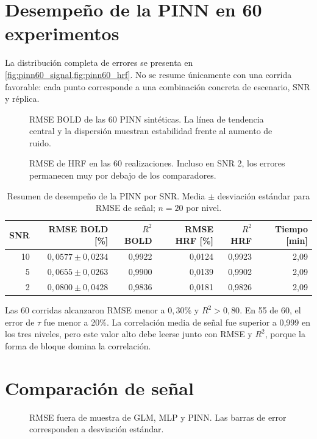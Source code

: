 \section{Desempeño de la PINN en 60 experimentos}
La distribución completa de errores se presenta en \cref{fig:pinn60_signal,fig:pinn60_hrf}. No se resume únicamente con una corrida favorable: cada punto corresponde a una combinación concreta de escenario, SNR y réplica.

\begin{figure}[H]
\centering
{}
\caption{RMSE BOLD de las 60 PINN sintéticas. La línea de tendencia central y la dispersión muestran estabilidad frente al aumento de ruido.}
\label{fig:pinn60_signal}
\end{figure}

\begin{figure}[H]
\centering
{}
\caption{RMSE de HRF en las 60 realizaciones. Incluso en SNR 2, los errores permanecen muy por debajo de los comparadores.}
\label{fig:pinn60_hrf}
\end{figure}

\begin{table}[H]
\centering
\caption{Resumen de desempeño de la PINN por SNR. Media $\pm$ desviación estándar para RMSE de señal; $n=20$ por nivel.}
\label{tab:pinn_summary}
\begin{tabular}{rrrrrr}
\toprule
\textbf{SNR} & \textbf{RMSE BOLD [\%]} & \textbf{$R^2$ BOLD} & \textbf{RMSE HRF [\%]} & \textbf{$R^2$ HRF} & \textbf{Tiempo [min]} \\
\midrule
10 & $0,0577\pm0,0234$ & 0,9922 & 0,0124 & 0,9923 & 2,09 \\
5  & $0,0655\pm0,0263$ & 0,9900 & 0,0139 & 0,9902 & 2,09 \\
2  & $0,0800\pm0,0428$ & 0,9836 & 0,0181 & 0,9826 & 2,09 \\
\bottomrule
\end{tabular}
\end{table}

Las 60 corridas alcanzaron RMSE menor a $0{,}30\%$ y $R^2>0{,}80$. En 55 de 60, el error de $\tau$ fue menor a 20\%. La correlación media de señal fue superior a 0,999 en los tres niveles, pero este valor alto debe leerse junto con RMSE y $R^2$, porque la forma de bloque domina la correlación.

\section{Comparación de señal}
\begin{figure}[H]
\centering
{}
\caption{RMSE fuera de muestra de GLM, MLP y PINN. Las barras de error corresponden a desviación estándar.}
\label{fig:synthetic_signal_summary}
\end{figure}

